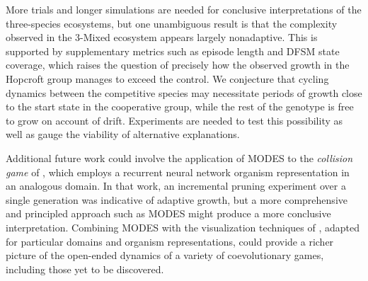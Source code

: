 \documentclass[letterpaper]{article}
\renewcommand{\label}[1]{\gdef\labelname{##1}}%
\renewcommand{\caption}[1]{##1}%
\begin{document}
More trials and longer simulations are needed for conclusive interpretations of the three-species ecosystems, but one unambiguous result is that the complexity observed in the 3-Mixed ecosystem appears largely nonadaptive. This is supported by supplementary metrics such as episode length and DFSM state coverage, which raises the question of precisely how the observed growth in the Hopcroft group manages to exceed the control. We conjecture that cycling dynamics between the competitive species may necessitate periods of growth close to the start state in the cooperative group, while the rest of the genotype is free to grow on account of drift. Experiments are needed to test this possibility as well as gauge the viability of alternative explanations.

Additional future work could involve the application of MODES to the \textit{collision game} of \cite{willkens2022}, which employs a recurrent neural network organism representation in an analogous domain. In that work, an incremental pruning experiment over a single generation was indicative of adaptive growth, but a more comprehensive and principled approach such as MODES might produce a more conclusive interpretation. Combining MODES with the visualization techniques of \cite{dolson2020}, adapted for particular domains and organism representations, could provide a richer picture of the open-ended dynamics of a variety of coevolutionary games, including those yet to be discovered.






\footnotesize

\end{document}
